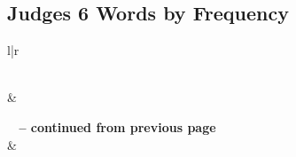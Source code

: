 

\subsection{Judges 6 Words by Frequency}


\normalsize
 
\begin{center}
\begin{longtable}{l|r}
\caption[Judges 6 Words by Frequency]{Judges 6 Words by Frequency}\label{table:WordsbyFrequency for Judges 6} \\
\hline {} &  \\ \hline 
\endfirsthead
 
{{\bfseries \tablename\ \thetable{} -- continued from previous page}} \\  
\hline {} &  \\ \hline 
\endhead
 

\end{longtable}
\end{center}
